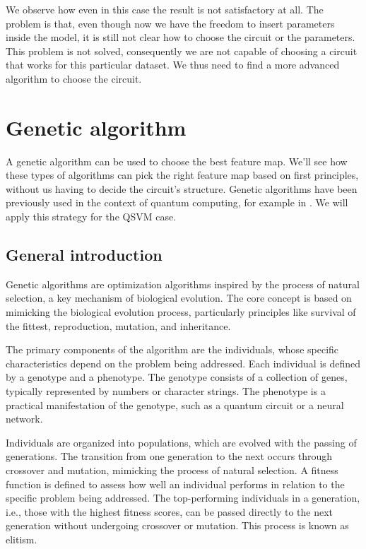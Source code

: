 \documentclass[12pt]{article}
\begin{document}
We observe how even in this case the result is not satisfactory at all. The problem is that, even though now we have the freedom to insert parameters inside the model, it is still not clear how to choose the circuit or the parameters. This problem is not solved, consequently we are not capable of choosing a circuit that works for this particular dataset. We thus need to find a more advanced algorithm to choose the circuit.



\newpage
\section{Genetic algorithm}

A genetic algorithm can be used to choose the best feature map. We'll see how these types of algorithms can pick the right feature map based on first principles, without us having to decide the circuit's structure. Genetic algorithms have been previously used in the context of quantum computing, for example in \cite{creevey2023a}\cite{creevey2023b}\cite{sunckel2023}. We will apply this strategy for the QSVM case. 

\subsection{General introduction}

Genetic algorithms \cite{mitchell1999}\cite{eiben2003} are optimization algorithms inspired by the process of natural selection, a key mechanism of biological evolution. The core concept is based on mimicking the biological evolution process, particularly principles like survival of the fittest, reproduction, mutation, and inheritance.

The primary components of the algorithm are the individuals, whose specific characteristics depend on the problem being addressed. Each individual is defined by a genotype and a phenotype. The genotype consists of a collection of genes, typically represented by numbers or character strings. The phenotype is a practical manifestation of the genotype, such as a quantum circuit or a neural network.

Individuals are organized into populations, which are evolved with the passing of generations. The transition from one generation to the next occurs through crossover and mutation, mimicking the process of natural selection. A fitness function is defined to assess how well an individual performs in relation to the specific problem being addressed. The top-performing individuals in a generation, i.e., those with the highest fitness scores, can be passed directly to the next generation without undergoing crossover or mutation. This process is known as elitism.
\end{document}
